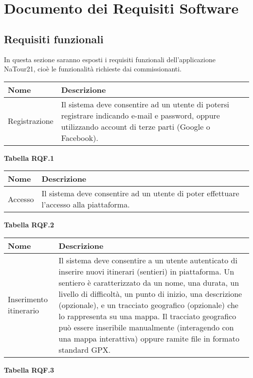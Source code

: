 \documentclass{natourDoc}
\begin{document}
\section{Documento dei Requisiti Software}
	\subsection{Requisiti funzionali}
	In questa sezione saranno esposti i requisiti funzionali dell'applicazione NaTour21, cioè le funzionalità richieste dai commissionanti.

	\begin{center}
		\begin{tabular}{ |p{5cm}|p{10.3cm}| } 
		 \hline
		 \rowcolor{PineGreen!70}
		 \textbf{Nome} & \textbf{Descrizione} \\
		 \hline
		  Registrazione & Il sistema deve consentire ad un utente di potersi registrare indicando e-mail e password, oppure utilizzando account di terze parti (Google o Facebook).\\ 
		 \hline
		\end{tabular}
	\end{center}
	\textbf{Tabella RQF.1}

	\begin{center}
		\begin{tabular}{ |p{5cm}|p{10.3cm}| } 
		 \hline
		 \rowcolor{PineGreen!70}
		 \textbf{Nome} & \textbf{Descrizione} \\
		 \hline
		  Accesso & Il sistema deve consentire ad un utente di poter effettuare l'accesso alla piattaforma.\\ 
		 \hline
		\end{tabular}
	\end{center}
	\textbf{Tabella RQF.2}

	\begin{center}
		\begin{tabular}{ |p{5cm}|p{10.3cm}| } 
		 \hline
		 \rowcolor{PineGreen!70}
		 \textbf{Nome} & \textbf{Descrizione} \\
		 \hline
		  Inserimento itinerario &  Il sistema deve consentire a un utente autenticato di inserire nuovi itinerari (sentieri) in piattaforma. Un sentiero è
		  caratterizzato da un nome, una durata, un livello di difficoltà, un punto di inizio, una descrizione
		  (opzionale), e un tracciato geografico (opzionale) che lo rappresenta su una mappa. Il tracciato
		  geografico può essere inseribile manualmente (interagendo con una mappa interattiva) oppure
		  ramite file in formato standard GPX.\\ 
		 \hline
		\end{tabular}
	\end{center}
	\textbf{Tabella RQF.3}
\end{document}
